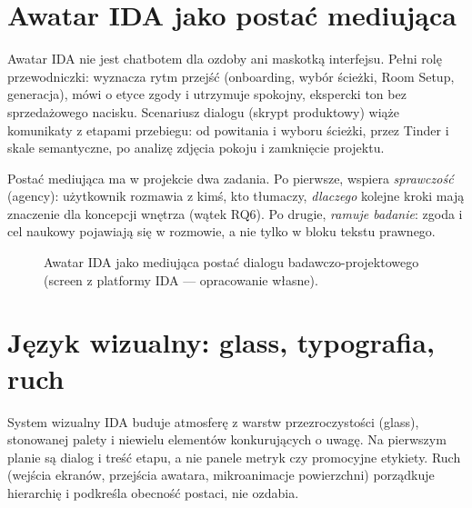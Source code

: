\section{Awatar IDA jako postać mediująca}
\label{ch07:sec:awatar}

Awatar IDA nie jest chatbotem dla ozdoby ani maskotką interfejsu. Pełni rolę przewodniczki: wyznacza rytm przejść (onboarding, wybór ścieżki, Room Setup, generacja), mówi o etyce zgody i utrzymuje spokojny, ekspercki ton bez sprzedażowego nacisku.
Scenariusz dialogu (skrypt produktowy) wiąże komunikaty z etapami przebiegu: od powitania i wyboru ścieżki, przez Tinder i skale semantyczne, po analizę zdjęcia pokoju i zamknięcie projektu.

Postać mediująca ma w projekcie dwa zadania. Po pierwsze, wspiera \emph{sprawczość} (agency): użytkownik rozmawia z kimś, kto tłumaczy, \emph{dlaczego} kolejne kroki mają znaczenie dla koncepcji wnętrza (wątek RQ6). Po drugie, \emph{ramuje badanie}: zgoda i cel naukowy pojawiają się w rozmowie, a nie tylko w bloku tekstu prawnego.

\begin{figure}[htbp]
  \centering
  \caption{Awatar IDA jako mediująca postać dialogu badawczo-projektowego (screen z platformy IDA --- opracowanie własne).}
  \label{fig:ch07:avatar}
\end{figure}

\section{Język wizualny: glass, typografia, ruch}
\label{ch07:sec:ui}

System wizualny IDA buduje atmosferę z warstw przezroczystości (glass), stonowanej palety i niewielu elementów konkurujących o uwagę. Na pierwszym planie są dialog i treść etapu, a nie panele metryk czy promocyjne etykiety. Ruch (wejścia ekranów, przejścia awatara, mikroanimacje powierzchni) porządkuje hierarchię i podkreśla obecność postaci, nie ozdabia.

